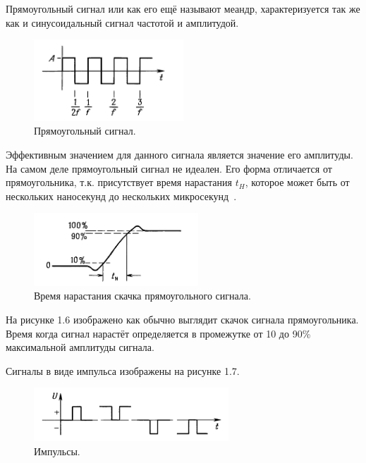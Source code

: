 	Прямоугольный сигнал или как его ещё называют меандр, характеризуется так же как и синусоидальный сигнал частотой и амплитудой.
	\begin{figure}[H]
    \centering
    \includegraphics[width=0.5\textwidth]{../image/s_p.png}
    \caption{Прямоугольный сигнал.}
	\end{figure}

	Эффективным значением для данного сигнала является значение его амплитуды. На самом деле прямоугольный сигнал не идеален. Его форма отличается от прямоугольника, т.к. присутствует время нарастания $t_{H}$, которое может быть от нескольких наносекунд до нескольких микросекунд~\cite{is1}.

	\begin{figure}[H]
    \centering
    \includegraphics[width=0.55\textwidth]{../image/s_p_t.png}
    \caption{Время нарастания скачка прямоугольного сигнала.}
	\end{figure}
	
	На рисунке 1.6 изображено как обычно выглядит скачок сигнала прямоугольника. Время когда сигнал нарастёт определяется в промежутке от 10 до 90\% максимальной амплитуды сигнала.

Сигналы в виде импульса изображены на рисунке 1.7.

	\begin{figure}[H]
    \centering
    \includegraphics[width=0.65\textwidth]{../image/s_i.png}
    \caption{Импульсы.}
	\end{figure}
	
